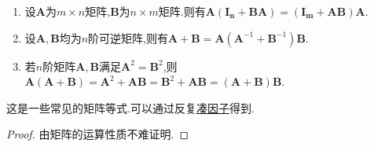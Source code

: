 \documentclass[../../main.tex]{subfiles}%
\begin{document}
\begin{proposition}[一些矩阵等式]\label{proposition:一些矩阵等式}
\begin{enumerate}
\item 设$\boldsymbol{A}$为$m\times n$矩阵,$\boldsymbol{B}$为$n\times m$矩阵.则有$\boldsymbol{A}\left( \boldsymbol{I}_{\boldsymbol{n}}+\boldsymbol{BA} \right) =\left( \boldsymbol{I}_{\boldsymbol{m}}+\boldsymbol{AB} \right) \boldsymbol{A}$.

\item 设$\boldsymbol{A},\boldsymbol{B}$均为$n$阶可逆矩阵,则有$\boldsymbol{A}+\boldsymbol{B}=\boldsymbol{A}(\boldsymbol{A}^{-1}+\boldsymbol{B}^{-1})\boldsymbol{B}$.

\item 若$n$阶矩阵$\boldsymbol{A},\boldsymbol{B}$满足$\boldsymbol{A}^2=\boldsymbol{B}^2$,则$\boldsymbol{A}(\boldsymbol{A}+\boldsymbol{B})=\boldsymbol{A}^2+\boldsymbol{AB}=\boldsymbol{B}^2+\boldsymbol{AB}=(\boldsymbol{A}+\boldsymbol{B})\boldsymbol{B}$.
\end{enumerate}
\end{proposition}
\begin{note}
这是一些常见的矩阵等式.可以通过反复\hyperref[proposition:矩阵的逆运算]{凑因子}得到.
\end{note}
\begin{proof}

由矩阵的运算性质不难证明.

\end{proof}
\end{document}
